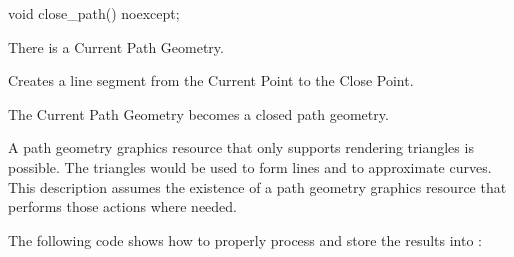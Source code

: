 \begin{itemdecl}
  void close_path() noexcept;
\end{itemdecl}
\begin{itemdescr}
	\pnum
	\preconditions
	There is a Current Path Geometry.
	
	\pnum
	\effects
	Creates a line segment from the Current Point to the Close Point.
	
	\pnum
	The Current Path Geometry becomes a closed path geometry.

\end{itemdescr}

\pnum
\enternote
A path geometry graphics resource that only supports rendering triangles is possible. The triangles would be used to form lines and to approximate curves. This description assumes the existence of a path geometry graphics resource that performs those actions where needed.
\exitnote

\pnum
The following code shows how to properly process  and store the results into :


